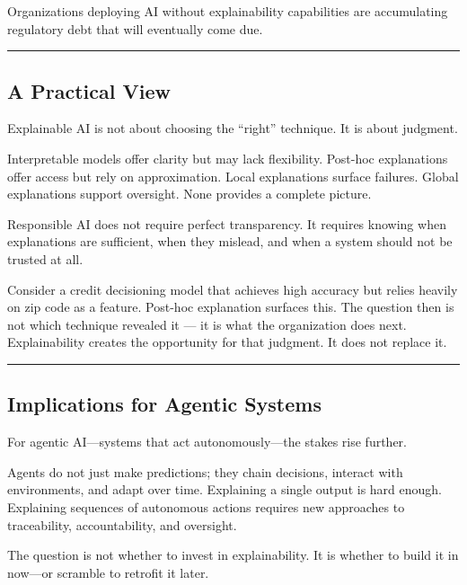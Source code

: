 \documentclass[
  letterpaper,
  DIV=11,
  numbers=noendperiod]{scrartcl}
\begin{document}
Organizations deploying AI without explainability capabilities are
accumulating regulatory debt that will eventually come due.

\begin{center}\rule{0.5\linewidth}{0.5pt}\end{center}

\subsection{A Practical View}\label{a-practical-view}

Explainable AI is not about choosing the ``right'' technique. It is
about judgment.

Interpretable models offer clarity but may lack flexibility. Post-hoc
explanations offer access but rely on approximation. Local explanations
surface failures. Global explanations support oversight. None provides a
complete picture.

Responsible AI does not require perfect transparency. It requires
knowing when explanations are sufficient, when they mislead, and when a
system should not be trusted at all.

Consider a credit decisioning model that achieves high accuracy but
relies heavily on zip code as a feature. Post-hoc explanation surfaces
this. The question then is not which technique revealed it --- it is
what the organization does next. Explainability creates the opportunity
for that judgment. It does not replace it.

\begin{center}\rule{0.5\linewidth}{0.5pt}\end{center}

\subsection{Implications for Agentic
Systems}\label{implications-for-agentic-systems}

For agentic AI---systems that act autonomously---the stakes rise
further.

Agents do not just make predictions; they chain decisions, interact with
environments, and adapt over time. Explaining a single output is hard
enough. Explaining sequences of autonomous actions requires new
approaches to traceability, accountability, and oversight.

The question is not whether to invest in explainability. It is whether
to build it in now---or scramble to retrofit it later.
\end{document}
